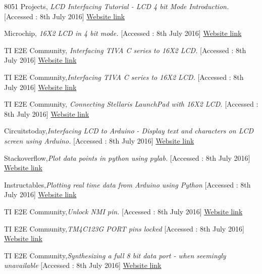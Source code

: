 \documentclass[a4paper,12pt,oneside]{book}
\begin{document}
\begin{thebibliography}{li}

8051 Projects, {\em LCD Interfacing Tutorial - LCD 4 bit Mode Introduction.}  [Accessed : 8th July 2016] 
\href{http://www.8051projects.net/lcd-interfacing/lcd-4-bit.php}{Website link}

Microchip, {\em 16X2 LCD in 4 bit mode.}  [Accessed : 8th July 2016]  
\href{http://www.microchip.com/forums/m656930.aspx}{Website link}

TI E2E Community, {\em Interfacing TIVA C series to 16X2 LCD.} [Accessed : 8th July 2016] 
\href{https://e2e.ti.com/support/microcontrollers/tiva\_arm/f/908/t/348669}{Website link}

TI E2E Community,{\em Interfacing TIVA C series to 16X2 LCD.}  [Accessed : 8th July 2016] 
\href{http://www.circuitstoday.com/interfacing-lcd-to-arduino}{Website link}

TI E2E Community, {\em Connecting Stellaris LaunchPad with 16X2 LCD.}  [Accessed : 8th July 2016] 
\href{https://e2e.ti.com/support/microcontrollers/tiva\_arm/f/908/t/279206}{Website link}

Circuitstoday,{\em Interfacing LCD to Arduino - Display text and characters on LCD screen using Arduino.}  [Accessed : 8th July 2016] 
\href{https://e2e.ti.com/support/microcontrollers/tiva\_arm/f/908/t/385440}{Website link}


Stackoverflow,{\em Plot data points in python using pylab.}  [Accessed : 8th July 2016] 
\href{http://stackoverflow.com/questions/15859534/plot-data-points-in-python-using-pylab}{Website link}

Instructables,{\em Plotting real time data from Arduino using Python}  [Accessed : 8th July 2016] 
\href{http://www.instructables.com/id/Plotting-real-time-data-from-Arduino-using-Python-/}{Website link}


TI E2E Community,{\em Unlock NMI pin.}  [Accessed : 8th July 2016] 
\href{https://e2e.ti.com/support/microcontrollers/tiva\_arm/f/908/p/298835/1042023}{Website link}



TI E2E Community,{\em TM4C123G PORT pins locked}  [Accessed : 8th July 2016] 
\href{http://e2e.ti.com/support/microcontrollers/tiva\_arm/f/908/p/398941/1410634}{Website link}


TI E2E Community,{\em Synthesizing a full 8 bit data port - when seemingly unavailable}  [Accessed : 8th July 2016] 
\href{http://e2e.ti.com/support/microcontrollers/tiva\_arm/f/908/t/279242}{Website link}




\end{thebibliography}
\end{document}
